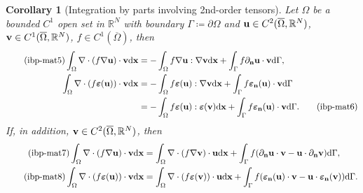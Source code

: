 \documentclass[oneside,11pt]{book}
\numberwithin{equation}{section}
\newtheorem{corollary}{Corollary}[section]
\begin{document}
\begin{corollary}[Integration by parts involving 2nd-order tensors]
    Let $\Omega$ be a bounded $C^1$ open set in $\mathbb{R}^N$ with boundary $\Gamma\coloneqq\partial\Omega$ and ${\bf u}\in C^2(\overline{\Omega},\mathbb{R}^N)$, ${\bf v}\in C^1(\overline{\Omega},\mathbb{R}^N)$, $f\in C^1(\overline{\Omega})$, then
    \begin{align}
        \label{integration by parts for matrix 5}
        \tag{ibp-mat5}
        \int_\Omega \nabla\cdot(f\nabla{\bf u})\cdot{\bf v}{\rm d}{\bf x} &= -\int_\Omega f\nabla{\bf u}:\nabla{\bf v}{\rm d}{\bf x} + \int_\Gamma f\partial_{\bf n}{\bf u}\cdot{\bf v}{\rm d}\Gamma,\\
        \int_\Omega \nabla\cdot(f\boldsymbol{\varepsilon}({\bf u}))\cdot{\bf v}{\rm d}{\bf x} &=  -\int_\Omega f\boldsymbol{\varepsilon}({\bf u}):\nabla{\bf v}{\rm d}{\bf x} + \int_\Gamma f\boldsymbol{\varepsilon}_{\bf n}({\bf u})\cdot{\bf v}{\rm d}\Gamma\nonumber\\
        &= -\int_\Omega f\boldsymbol{\varepsilon}({\bf u}):\boldsymbol{\varepsilon}({\bf v}){\rm d}{\bf x} + \int_\Gamma f\boldsymbol{\varepsilon}_{\bf n}({\bf u})\cdot{\bf v}{\rm d}\Gamma.
        \label{integration by parts for matrix 6}
        \tag{ibp-mat6}
    \end{align}
    If, in addition, ${\bf v}\in C^2(\overline{\Omega},\mathbb{R}^N)$, then
    \begin{align}
        \label{integration by parts for matrix 7}
        \tag{ibp-mat7}
        \int_\Omega \nabla\cdot(f\nabla{\bf u})\cdot{\bf v}{\rm d}{\bf x} &= \int_\Omega \nabla\cdot(f\nabla{\bf v})\cdot{\bf u}{\rm d}{\bf x} + \int_\Gamma f(\partial_{\bf n}{\bf u}\cdot{\bf v} - {\bf u}\cdot\partial_{\bf n}{\bf v}){\rm d}\Gamma,\\
        \label{integration by parts for matrix 8}
        \tag{ibp-mat8}
        \int_\Omega \nabla\cdot(f\boldsymbol{\varepsilon}({\bf u}))\cdot{\bf v}{\rm d}{\bf x} &= \int_\Omega \nabla\cdot(f\boldsymbol{\varepsilon}({\bf v}))\cdot{\bf u}{\rm d}{\bf x} + \int_\Gamma f(\boldsymbol{\varepsilon}_{\bf n}({\bf u})\cdot{\bf v} - {\bf u}\cdot\boldsymbol{\varepsilon}_{\bf n}({\bf v})){\rm d}\Gamma.
    \end{align}
\end{corollary}
\end{document}
